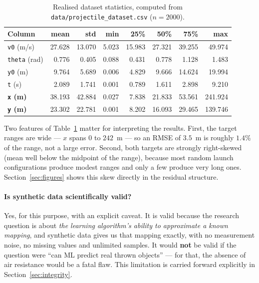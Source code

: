 \documentclass[11pt,a4paper]{article}
\begin{document}
\begin{table}[h]
\centering
\small
\caption{Realised dataset statistics, computed from
         \texttt{data/projectile\_dataset.csv} ($n=2000$).}
\label{tab:stats}
\begin{tabular}{@{}lrrrrrrr@{}}
\toprule
\textbf{Column} & \textbf{mean} & \textbf{std} & \textbf{min} &
\textbf{25\%} & \textbf{50\%} & \textbf{75\%} & \textbf{max} \\
\midrule
\texttt{v0} (m/s)    & 27.628 & 13.070 & 5.023 & 15.983 & 27.321 & 39.255 & 49.974 \\
\texttt{theta} (rad) &  0.776 &  0.405 & 0.088 &  0.431 &  0.778 &  1.128 &  1.483 \\
\texttt{y0} (m)      &  9.764 &  5.689 & 0.006 &  4.829 &  9.666 & 14.624 & 19.994 \\
\texttt{t} (s)       &  2.089 &  1.741 & 0.001 &  0.789 &  1.611 &  2.898 &  9.210 \\
\midrule
\textbf{\texttt{x} (m)} & 38.193 & 42.884 & 0.027 & 7.838 & 21.833 & 53.561 & 241.924 \\
\textbf{\texttt{y} (m)} & 23.302 & 22.781 & 0.001 & 8.202 & 16.093 & 29.465 & 139.746 \\
\bottomrule
\end{tabular}
\end{table}

Two features of Table~\ref{tab:stats} matter for interpreting the results. First, the target ranges
are wide --- $x$ spans $0$ to $242$~m --- so an RMSE of $3.5$~m is roughly $1.4\%$ of the range, not
a large error. Second, both targets are strongly right-skewed (mean well below the midpoint of the
range), because most random launch configurations produce modest ranges and only a few produce very
long ones. Section~\ref{sec:figures} shows this skew directly in the residual structure.

\paragraph{Is synthetic data scientifically valid?}
Yes, for this purpose, with an explicit caveat. It is valid because the research question is about
\emph{the learning algorithm's ability to approximate a known mapping}, and synthetic data gives us
that mapping exactly, with no measurement noise, no missing values and unlimited samples. It would
\textbf{not} be valid if the question were ``can ML predict real thrown objects'' --- for that, the
absence of air resistance would be a fatal flaw. This limitation is carried forward explicitly in
Section~\ref{sec:integrity}.
\end{document}
